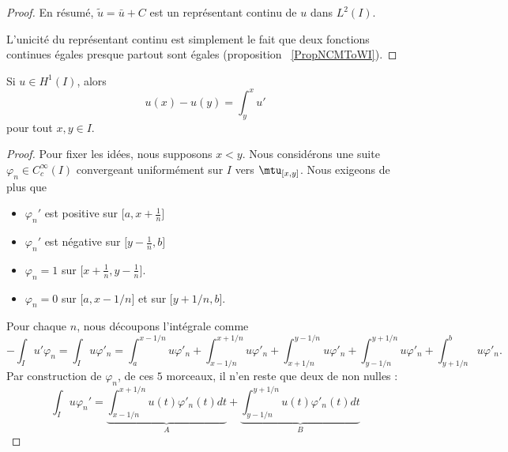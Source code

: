 \begin{proof}
	En résumé, \(\tilde u=\bar u+C\) est un représentant continu de \( u\) dans \( L^2(I)\).

	L'unicité du représentant continu est simplement le fait que deux fonctions continues égales presque partout sont égales (proposition ~\ref{PropNCMToWI}).

\end{proof}

\begin{proposition}     \label{PropGWOIoDg}
	Si \( u\in H^1(I)\), alors
	\begin{equation}
		u(x)-u(y)=\int_y^xu'
	\end{equation}
	pour tout \( x,y\in I\).
\end{proposition}

\begin{proof}
	Pour fixer les idées, nous supposons \( x<y\). Nous considérons une suite \( \varphi_n\in C^{\infty}_c(I)\) convergeant uniformément sur \( I\) vers \( \mtu_{\mathopen[ x , y \mathclose]}\). Nous exigeons de plus que
	\begin{itemize}
		\item
		      \( \varphi_n'\) est positive sur \( \mathopen[ a , x+\frac{1}{ n } \mathclose]\)
		\item
		      \( \varphi_n'\) est négative sur \( \mathopen[ y-\frac{1}{ n } , b \mathclose]\)
		\item
		      \( \varphi_n=1\) sur \( \mathopen[ x+\frac{1}{ n } , y-\frac{1}{ n } \mathclose]\).
		\item
		      \( \varphi_n=0\) sur \( \mathopen[ a , x-1/n \mathclose]\) et sur \( \mathopen[ y+1/n , b \mathclose]\).
	\end{itemize}
	Pour chaque \( n\), nous découpons l'intégrale comme
	\begin{equation}        \label{EqRPwqpve}
		-\int_Iu'\varphi_n=\int_Iu\varphi'_n=\int_a^{x-1/n}u\varphi'_n+\int_{x-1/n}^{x+1/n}u\varphi'_n+\int_{x+1/n}^{y-1/n}u\varphi'_n+\int_{y-1/n}^{y+1/n}u\varphi'_n+\int_{y+1/n}^{b}u\varphi'_n.
	\end{equation}
	Par construction de \( \varphi_n\), de ces \( 5\) morceaux, il n'en reste que deux de non nulles :
	\begin{equation}
		\int_Iu\varphi_n'=\underbrace{\int_{x-1/n}^{x+1/n}u(t)\varphi'_n(t)dt}_A+\underbrace{\int_{y-1/n}^{y+1/n}u(t)\varphi'_n(t)dt}_B
	\end{equation}


\end{proof}
